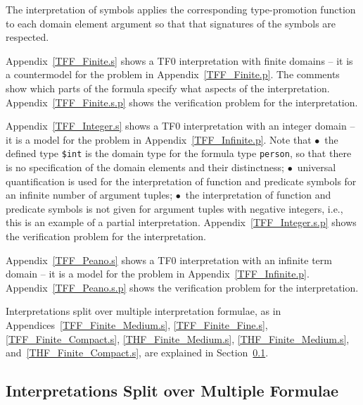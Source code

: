 \documentclass{easychair}
\newcommand{\smalltt}[1]{\small \texttt{#1}}
\newenvironment{packed_itemize}{
\vspace*{-0.2em}
\begin{itemize}
\setlength{\partopsep}{0pt}
\setlength{\itemsep}{1pt}
\setlength{\parskip}{0pt}
\setlength{\parsep}{0pt}
}{\end{itemize}}
\begin{document}
The interpretation of symbols applies the corresponding type-promotion function to each domain
element argument so that that signatures of the symbols are respected.

\begin{packed_itemize}
\item Appendix~\ref{TFF_Finite.s} shows a TF0 interpretation with finite domains -- it is a 
      countermodel for the problem in Appendix~\ref{TFF_Finite.p}.
      The comments show which parts of the formula specify what aspects of the interpretation.
      Appendix~\ref{TFF_Finite.s.p} shows the verification problem for the interpretation.
\item Appendix~\ref{TFF_Integer.s} shows a TF0 interpretation with an integer domain -- it 
      is a model for the problem in Appendix~\ref{TFF_Infinite.p}.
      Note that $\bullet$~the defined type {\smalltt{\$int}} is the domain type for the formula 
      type {\smalltt{person}}, so that there is no specification of the domain elements and their 
      distinctness; $\bullet$~universal quantification is used for the interpretation of function 
      and predicate symbols for an infinite number of argument tuples; $\bullet$~the 
      interpretation of function and predicate symbols is not given for argument tuples with 
      negative integers, i.e., this is an example of a partial interpretation.
      Appendix~\ref{TFF_Integer.s.p} shows the verification problem for the interpretation.
\item Appendix~\ref{TFF_Peano.s} shows a TF0 interpretation with an infinite term domain -- it 
      is a model for the problem in Appendix~\ref{TFF_Infinite.p}.
      Appendix~\ref{TFF_Peano.s.p} shows the verification problem for the interpretation.
\end{packed_itemize}

Interpretations split over multiple interpretation formulae, as in 
Appendices~\ref{TFF_Finite_Medium.s}, \ref{TFF_Finite_Fine.s}, \ref{TFF_Finite_Compact.s}, 
\ref{THF_Finite_Medium.s}, \ref{THF_Finite_Medium.s}, and~\ref{THF_Finite_Compact.s}, are 
explained in Section~\ref{NewTarskianSplit}.

\subsection{Interpretations Split over Multiple Formulae}
\label{NewTarskianSplit}
\end{document}
